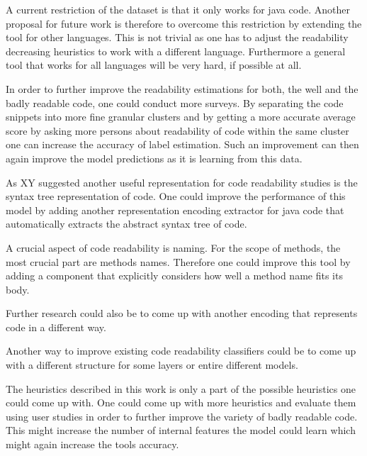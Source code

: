 \documentclass[%
class=scrreprt,
chapterprefix=false,%
open=right,%
twoside=false,%
paper=a4,%
logofile={Logo\_zentral\_farbig\_EN.png},%
thesistype=master,%
UKenglish,%
]{se2thesis}
\begin{document}
	A current restriction of the dataset is that it only works for java code. Another proposal for future work is therefore to overcome this restriction by extending the tool for other languages. This is not trivial as one has to adjust the readability decreasing heuristics to work with a different language. Furthermore a general tool that works for all languages will be very hard, if possible at all.
	
	In order to further improve the readability estimations for both, the well and the badly readable code, one could conduct more surveys. By separating the code snippets into more fine granular clusters and by getting a more accurate average score by asking more persons about readability of code within the same cluster one can increase the accuracy of label estimation. Such an improvement can then again improve the model predictions as it is learning from this data.
	
	As XY suggested another useful representation for code readability studies is the syntax tree representation of code. One could improve the performance of this model by adding another representation encoding extractor for java code that automatically extracts the abstract syntax tree of code. 
	
	A crucial aspect of code readability is naming. For the scope of methods, the most crucial part are methods names. Therefore one could improve this tool by adding a component that explicitly considers how well a method name fits its body.
	
	Further research could also be to come up with another encoding that represents code in a different way.
	
	Another way to improve existing code readability classifiers could be to come up with a different structure for some layers or entire different models.
	
	The heuristics described in this work is only a part of the possible heuristics one could come up with. One could come up with more heuristics and evaluate them using user studies in order to further improve the variety of badly readable code. This might increase the number of internal features the model could learn which might again increase the tools accuracy.

	
	\backmatter
	
	\printbibliography
	
\end{document}
